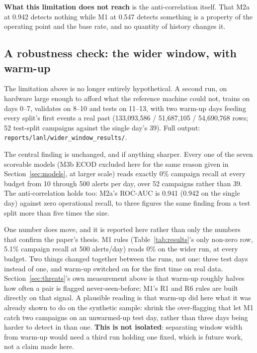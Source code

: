 \documentclass[11pt,a4paper]{article}
\begin{document}
\textbf{What this limitation does not reach} is the anti-correlation itself. That
M2a at 0.942 detects nothing while M1 at 0.547 detects something is a property of
the operating point and the base rate, and no quantity of history changes it.

\subsection{A robustness check: the wider window, with warm-up}
\label{sec:wider-window}

The limitation above is no longer entirely hypothetical. A second run, on
hardware large enough to afford what the reference machine could not, trains
on days 0--7, validates on 8--10 and tests on 11--13, with two warm-up days
feeding every split's first events a real past (133{,}093{,}586 /
51{,}687{,}105 / 54{,}690{,}768 rows; 52 test-split campaigns against the
single day's 39). Full output: \texttt{reports/lanl/wider\_window\_results/}.

The central finding is unchanged, and if anything sharper. Every one of the
seven scoreable models (M3b ECOD excluded here for the same reason given
in Section~\ref{sec:models}, at larger scale) reads exactly 0\% campaign
recall at every budget from 10 through 500 alerts per day, over 52 campaigns
rather than 39. The anti-correlation holds too: M2a's ROC-AUC is 0.941
(0.942 on the single day) against zero operational recall, to three figures
the same finding from a test split more than five times the size.

One number does move, and it is reported here rather than only the numbers
that confirm the paper's thesis. M1 rules (Table~\ref{tab:results}'s only
non-zero row, 5.1\% campaign recall at 500 alerts/day) reads 0\% on the
wider run, at every budget. Two things changed together between the runs,
not one: three test days instead of one, and warm-up switched on for the
first time on real data. Section~\ref{sec:threats}'s own measurement above is
that warm-up roughly halves how often a pair is flagged never-seen-before;
M1's R1 and R6 rules are built directly on that signal. A plausible reading
is that warm-up did here what it was already shown to do on the synthetic
sample: shrink the over-flagging that let M1 catch two campaigns on an
unwarmed-up test day, rather than three days being harder to detect in
than one. \textbf{This is not isolated}: separating window width from
warm-up would need a third run holding one fixed, which is future work, not
a claim made here.
\end{document}
